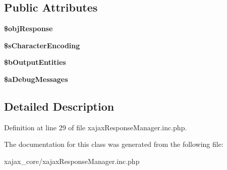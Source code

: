 \subsection*{Public Attributes}
\begin{DoxyCompactItemize}
\item 
\hypertarget{classxajaxResponseManager_abb0bfcb5e22ff0dafa1fe8652fcdf10b}{
{\bfseries \$objResponse}}
\label{classxajaxResponseManager_abb0bfcb5e22ff0dafa1fe8652fcdf10b}

\item 
\hypertarget{classxajaxResponseManager_a03d03b2caaec5d69b56fe49617ba53f1}{
{\bfseries \$sCharacterEncoding}}
\label{classxajaxResponseManager_a03d03b2caaec5d69b56fe49617ba53f1}

\item 
\hypertarget{classxajaxResponseManager_a59892b1cf020354dadc54729642d88ca}{
{\bfseries \$bOutputEntities}}
\label{classxajaxResponseManager_a59892b1cf020354dadc54729642d88ca}

\item 
\hypertarget{classxajaxResponseManager_a765f2ad66cdbaf6441aad7986f5fadc0}{
{\bfseries \$aDebugMessages}}
\label{classxajaxResponseManager_a765f2ad66cdbaf6441aad7986f5fadc0}

\end{DoxyCompactItemize}


\subsection{Detailed Description}


Definition at line 29 of file xajaxResponseManager.inc.php.



The documentation for this class was generated from the following file:\begin{DoxyCompactItemize}
\item 
xajax\_\-core/xajaxResponseManager.inc.php\end{DoxyCompactItemize}

